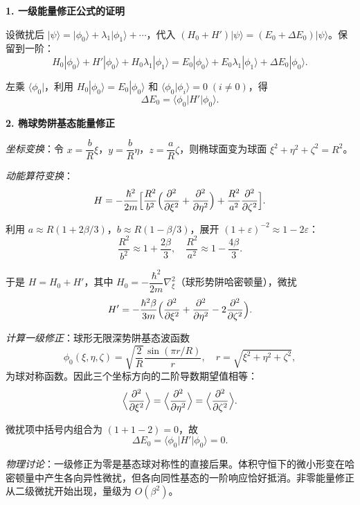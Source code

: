 \begin{derivationbox}[标准解题过程]
\textbf{1. 一级能量修正公式的证明}

设微扰后 $|\psi\rangle=|\phi_0\rangle+\lambda_1|\phi_1\rangle+\cdots$，代入 $(H_0+H')|\psi\rangle=(E_0+\Delta E_0)|\psi\rangle$。保留到一阶：
\[
H_0|\phi_0\rangle+H'|\phi_0\rangle+H_0\lambda_1|\phi_1\rangle=E_0|\phi_0\rangle+E_0\lambda_1|\phi_1\rangle+\Delta E_0|\phi_0\rangle.
\]

左乘 $\langle\phi_0|$，利用 $H_0|\phi_0\rangle=E_0|\phi_0\rangle$ 和 $\langle\phi_0|\phi_i\rangle=0\;(i\neq0)$，得
\begin{equation}
\boxed{\Delta E_0=\langle\phi_0|H'|\phi_0\rangle.}
\end{equation}

\textbf{2. 椭球势阱基态能量修正}

\textit{坐标变换}：令 $x=\dfrac{b}{R}\xi$，$y=\dfrac{b}{R}\eta$，$z=\dfrac{a}{R}\zeta$，则椭球面变为球面 $\xi^2+\eta^2+\zeta^2=R^2$。

\textit{动能算符变换}：
\[
H=-\frac{\hbar^2}{2m}\Bigl[\frac{R^2}{b^2}\Bigl(\frac{\partial^2}{\partial\xi^2}+\frac{\partial^2}{\partial\eta^2}\Bigr)+\frac{R^2}{a^2}\frac{\partial^2}{\partial\zeta^2}\Bigr].
\]

利用 $a\approx R(1+2\beta/3)$，$b\approx R(1-\beta/3)$，展开 $(1+\varepsilon)^{-2}\approx1-2\varepsilon$：
\[
\frac{R^2}{b^2}\approx1+\frac{2\beta}{3},\quad\frac{R^2}{a^2}\approx1-\frac{4\beta}{3}.
\]

于是 $H=H_0+H'$，其中 $H_0=-\dfrac{\hbar^2}{2m}\nabla_\xi^2$（球形势阱哈密顿量），微扰
\[
H'=-\frac{\hbar^2\beta}{3m}\Bigl(\frac{\partial^2}{\partial\xi^2}+\frac{\partial^2}{\partial\eta^2}-2\frac{\partial^2}{\partial\zeta^2}\Bigr).
\]

\textit{计算一级修正}：球形无限深势阱基态波函数
\[
\phi_0(\xi,\eta,\zeta)=\sqrt{\frac{2}{R}}\frac{\sin(\pi r/R)}{r},\quad r=\sqrt{\xi^2+\eta^2+\zeta^2},
\]
为球对称函数。因此三个坐标方向的二阶导数期望值相等：
\[
\Bigl\langle\frac{\partial^2}{\partial\xi^2}\Bigr\rangle=\Bigl\langle\frac{\partial^2}{\partial\eta^2}\Bigr\rangle=\Bigl\langle\frac{\partial^2}{\partial\zeta^2}\Bigr\rangle.
\]

微扰项中括号内组合为 $(1+1-2)=0$，故
\begin{equation}
\boxed{\Delta E_0=\langle\phi_0|H'|\phi_0\rangle=0.}
\end{equation}

\textit{物理讨论}：一级修正为零是基态球对称性的直接后果。体积守恒下的微小形变在哈密顿量中产生各向异性微扰，但各向同性基态的一阶响应恰好抵消。非零能量修正从二级微扰开始出现，量级为 $O(\beta^2)$。
\end{derivationbox}

